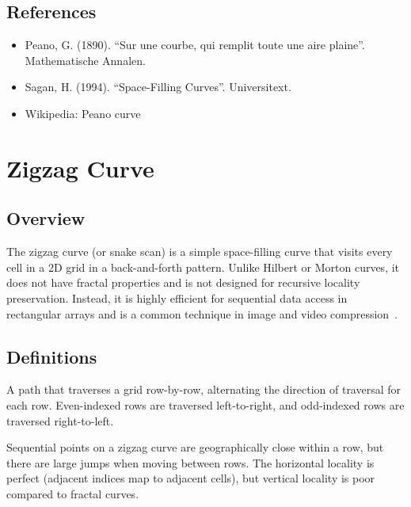 \subsection{References}
\begin{itemize}
    \item Peano, G. (1890). ``Sur une courbe, qui remplit toute une aire plaine''. Mathematische Annalen.
    \item Sagan, H. (1994). ``Space-Filling Curves''. Universitext.
    \item Wikipedia: Peano curve
\end{itemize}


\section{Zigzag Curve}
\label{sec:zigzag_curve}

\subsection{Overview}
The zigzag curve (or snake scan) is a simple space-filling curve that visits every cell in a 2D grid in a back-and-forth pattern. Unlike Hilbert or Morton curves, it does not have fractal properties and is not designed for recursive locality preservation. Instead, it is highly efficient for sequential data access in rectangular arrays and is a common technique in image and video compression~\cite{pennebaker1992}.

\subsection{Definitions}
\begin{definition}\label{def:zigzag_scan}
A path that traverses a grid row-by-row, alternating the direction of traversal for each row. Even-indexed rows are traversed left-to-right, and odd-indexed rows are traversed right-to-left.
\end{definition}

\begin{definition}\label{def:zigzag_locality}
Sequential points on a zigzag curve are geographically close within a row, but there are large jumps when moving between rows. The horizontal locality is perfect (adjacent indices map to adjacent cells), but vertical locality is poor compared to fractal curves.
\end{definition}

